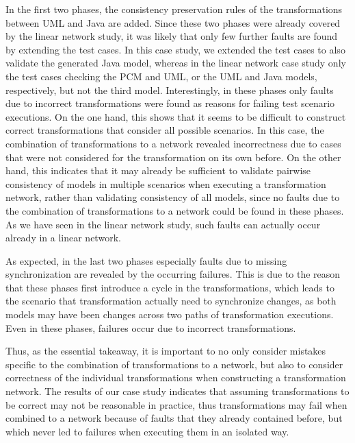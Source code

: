 In the first two phases, the consistency preservation rules of the transformations between \gls{UML} and Java are added.
Since these two phases were already covered by the linear network study, it was likely that only few further faults are found by extending the test cases.
In this case study, we extended the test cases to also validate the generated Java model, whereas in the linear network case study only the test cases checking the \gls{PCM} and \gls{UML}, or the \gls{UML} and Java models, respectively, but not the third model.
Interestingly, in these phases only faults due to incorrect transformations were found as reasons for failing test scenario executions.
On the one hand, this shows that it seems to be difficult to construct correct transformations that consider all possible scenarios.
In this case, the combination of transformations to a network revealed incorrectness due to cases that were not considered for the transformation on its own before.
On the other hand, this indicates that it may already be sufficient to validate pairwise consistency of models in multiple scenarios when executing a transformation network, rather than validating consistency of all models, since no faults due to the combination of transformations to a network could be found in these phases.
As we have seen in the linear network study, such faults can actually occur already in a linear network.

As expected, in the last two phases especially faults due to missing synchronization are revealed by the occurring failures.
This is due to the reason that these phases first introduce a cycle in the transformations, which leads to the scenario that transformation actually need to synchronize changes, as both models may have been changes across two paths of transformation executions.
Even in these phases, failures occur due to incorrect transformations.

Thus, as the essential takeaway, it is important to no only consider mistakes specific to the combination of transformations to a network, but also to consider correctness of the individual transformations when constructing a transformation network.
The results of our case study indicates that assuming transformations to be correct may not be reasonable in practice, thus transformations may fail when combined to a network because of faults that they already contained before, but which never led to failures when executing them in an isolated way.


